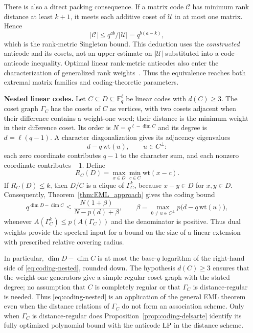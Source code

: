 \documentclass[10pt,a4paper]{article}
\theoremstyle{plain}
\numberwithin{equation}{section}
\begin{document}
There is also a direct packing consequence. If a matrix code $\mathcal C$ has minimum rank distance at least $k+1$, it meets each additive coset of $\mathcal U$ in at most one matrix. Hence
\[
 |\mathcal C|\le q^{ab}/|\mathcal U|=q^{b(a-k)},
\]
which is the rank-metric Singleton bound. This deduction uses the \emph{constructed} anticode and its cosets, not an upper estimate on $|\mathcal U|$ substituted into a code--anticode inequality. Optimal linear rank-metric anticodes also enter the characterization of generalized rank weights~\cite{Ravagnani_2016}. Thus the equivalence reaches both extremal matrix families and coding-theoretic parameters.
 

\medskip
\textbf{Nested linear codes.}
Let $C\subseteq D\subseteq\mathbb F_q^\ell$ be linear codes with
$d(C)\ge3$. The coset graph $\Gamma_C$ has the cosets of $C$ as vertices,
with two cosets adjacent when their difference contains a weight-one
word; their distance is the minimum weight in their difference coset.
Its order is $N=q^{\ell-\dim C}$ and its degree is $d=\ell(q-1)$.
A character diagonalization gives its adjacency eigenvalues
\[
 d-q\,\mathrm{wt}(u),\qquad u\in C^\perp:
\]
each zero coordinate contributes $q-1$ to the character sum, and each
nonzero coordinate contributes $-1$. Define
\[
 R_C(D)=\max_{x\in D}\min_{c\in C}\mathrm{wt}(x-c).
\]
If $R_C(D)\le k$, then $D/C$ is a clique of $\Gamma_C^k$, because
$x-y\in D$ for $x,y\in D$. Consequently,
Theorem~\ref{thm:EML_approach} gives the coding bound
\begin{equation}\label{eq:coding-nested}
 q^{\dim D-\dim C}\le
 \frac{N(1+\beta)}{N-p(d)+\beta},\qquad
 \beta=\max_{0\ne u\in C^\perp}p\bigl(d-q\,\mathrm{wt}(u)\bigr),
\end{equation}
whenever $A(\Gamma_C^k)\le p(A(\Gamma_C))$ and the denominator is positive.
Thus dual weights provide the spectral input for a bound on the size of
a linear extension with prescribed relative covering radius.

In particular, $\dim D-\dim C$ is at most the base-$q$ logarithm of the right-hand side of \eqref{eq:coding-nested}, rounded down. The hypothesis $d(C)\ge3$ ensures that the weight-one generators give a simple regular coset graph with the stated degree; no assumption that $C$ is completely regular or that $\Gamma_C$ is distance-regular is needed. Thus \eqref{eq:coding-nested} is an application of the general EML theorem even when the distance relations of $\Gamma_C$ do not form an association scheme. Only when $\Gamma_C$ is distance-regular does Proposition~\ref{prop:coding-delsarte} identify its fully optimized polynomial bound with the anticode LP in the distance scheme.
\end{document}
